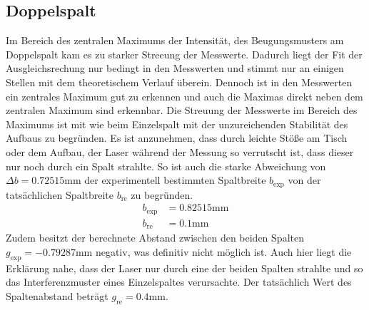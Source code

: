 \subsection{Doppelspalt}
Im Bereich des zentralen Maximums der Intensität, des Beugungsmusters am Doppelspalt kam es zu starker Streeung der Messwerte.
Dadurch liegt der Fit der Ausgleichsrechung nur bedingt in den Messwerten und stimmt nur an einigen Stellen mit dem theoretischem Verlauf überein.
Dennoch ist in den Messwerten ein zentrales Maximum gut zu erkennen und auch die Maximas direkt neben dem zentralen Maximum sind erkennbar.
Die Streuung der Messwerte im Bereich des Maximums ist mit wie beim Einzelspalt mit der unzureichenden Stabilität des Aufbaus zu begründen.
Es ist anzunehmen, dass durch leichte Stöße am Tisch oder dem Aufbau, der Laser während der Messung so verrutscht ist, dass dieser nur noch durch ein Spalt strahlte.
So ist auch die starke Abweichung von $\Delta b = 0.72515\si{\milli\meter}$ der experimentell bestimmten Spaltbreite $b_\text{exp}$ von der tatsächlichen Spaltbreite $b_\text{re}$ zu begründen.
\begin{align*}
b_\text{exp} &= 0.82515 \si{\milli\meter}\\
b_\text{re} &= 0.1 \si{\milli\meter}
\end{align*}
Zudem besitzt der berechnete Abstand zwischen den beiden Spalten $g_\text{exp} = -0.79287\si{\milli\meter}$ negativ, was definitiv nicht möglich ist.
Auch hier liegt die Erklärung nahe, dass der Laser nur durch eine der beiden Spalten strahlte und so das Interferenzmuster eines Einzelspaltes verursachte.
Der tatsächlich Wert des Spaltenabstand beträgt $g_\text{re} = 0.4\si{\milli\meter}$.

